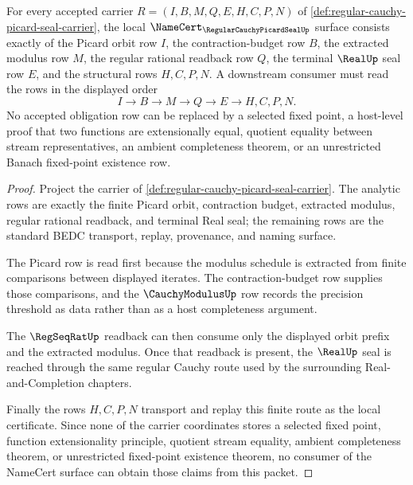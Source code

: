 \begin{theorem}
\label{thm:regular-cauchy-picard-seal-namecert-obligations}
For every accepted carrier $R=(I,B,M,Q,E,H,C,P,N)$ of \autoref{def:regular-cauchy-picard-seal-carrier}, the local $\NameCert_{\RegularCauchyPicardSealUp}$ surface consists exactly of the Picard orbit row $I$, the contraction-budget row $B$, the extracted modulus row $M$, the regular rational readback row $Q$, the terminal $\RealUp$ seal row $E$, and the structural rows $H,C,P,N$. A downstream consumer must read the rows in the displayed order
$$
I \to B \to M \to Q \to E \to H,C,P,N .
$$
No accepted obligation row can be replaced by a selected fixed point, a host-level proof that two functions are extensionally equal, quotient equality between stream representatives, an ambient completeness theorem, or an unrestricted Banach fixed-point existence row.
\end{theorem}
\begin{proof}
Project the carrier of \autoref{def:regular-cauchy-picard-seal-carrier}. The analytic rows are exactly the finite Picard orbit, contraction budget, extracted modulus, regular rational readback, and terminal Real seal; the remaining rows are the standard BEDC transport, replay, provenance, and naming surface.

The Picard row is read first because the modulus schedule is extracted from finite comparisons between displayed iterates. The contraction-budget row supplies those comparisons, and the $\CauchyModulusUp$ row records the precision threshold as data rather than as a host completeness argument.

The $\RegSeqRatUp$ readback can then consume only the displayed orbit prefix and the extracted modulus. Once that readback is present, the $\RealUp$ seal is reached through the same regular Cauchy route used by the surrounding Real-and-Completion chapters.

Finally the rows $H,C,P,N$ transport and replay this finite route as the local certificate. Since none of the carrier coordinates stores a selected fixed point, function extensionality principle, quotient stream equality, ambient completeness theorem, or unrestricted fixed-point existence theorem, no consumer of the NameCert surface can obtain those claims from this packet.
\end{proof}

